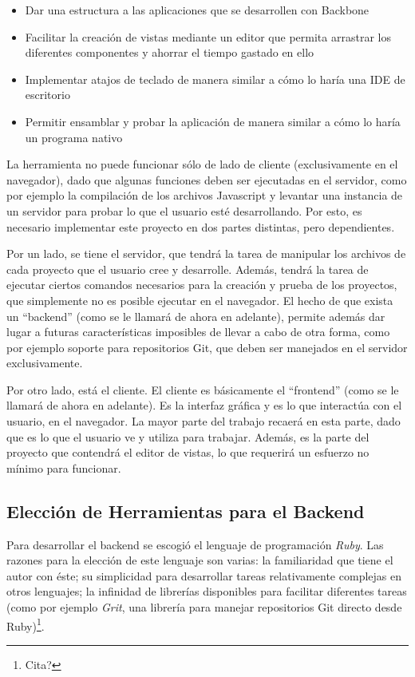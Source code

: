 \documentclass[12pt,titlepage,]{article}
\begin{document}
\begin{itemize}
\item
  Dar una estructura a las aplicaciones que se desarrollen con Backbone
\item
  Facilitar la creación de vistas mediante un editor que permita
  arrastrar los diferentes componentes y ahorrar el tiempo gastado en
  ello
\item
  Implementar atajos de teclado de manera similar a cómo lo haría una
  IDE de escritorio
\item
  Permitir ensamblar y probar la aplicación de manera similar a cómo lo
  haría un programa nativo
\end{itemize}

La herramienta no puede funcionar sólo de lado de cliente
(exclusivamente en el navegador), dado que algunas funciones deben ser
ejecutadas en el servidor, como por ejemplo la compilación de los
archivos Javascript y levantar una instancia de un servidor para probar
lo que el usuario esté desarrollando. Por esto, es necesario implementar
este proyecto en dos partes distintas, pero dependientes.

Por un lado, se tiene el servidor, que tendrá la tarea de manipular los
archivos de cada proyecto que el usuario cree y desarrolle. Además,
tendrá la tarea de ejecutar ciertos comandos necesarios para la creación
y prueba de los proyectos, que simplemente no es posible ejecutar en el
navegador. El hecho de que exista un ``backend'' (como se le llamará de
ahora en adelante), permite además dar lugar a futuras características
imposibles de llevar a cabo de otra forma, como por ejemplo soporte para
repositorios Git, que deben ser manejados en el servidor exclusivamente.

Por otro lado, está el cliente. El cliente es básicamente el
``frontend'' (como se le llamará de ahora en adelante). Es la interfaz
gráfica y es lo que interactúa con el usuario, en el navegador. La mayor
parte del trabajo recaerá en esta parte, dado que es lo que el usuario
ve y utiliza para trabajar. Además, es la parte del proyecto que
contendrá el editor de vistas, lo que requerirá un esfuerzo no mínimo
para funcionar.

\subsection{Elección de Herramientas para el Backend}

Para desarrollar el backend se escogió el lenguaje de programación
\emph{Ruby}. Las razones para la elección de este lenguaje son varias:
la familiaridad que tiene el autor con éste; su simplicidad para
desarrollar tareas relativamente complejas en otros lenguajes; la
infinidad de librerías disponibles para facilitar diferentes tareas
(como por ejemplo \emph{Grit}, una librería para manejar repositorios
Git directo desde Ruby)\footnote{Cita?}.
\end{document}
